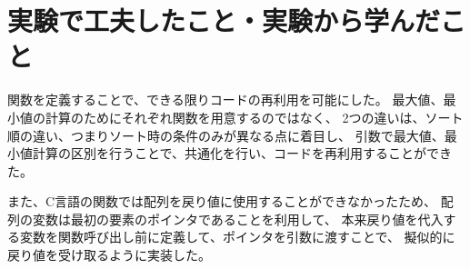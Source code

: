 

\section{実験で工夫したこと・実験から学んだこと}
関数を定義することで、できる限りコードの再利用を可能にした。
最大値、最小値の計算のためにそれぞれ関数を用意するのではなく、
2つの違いは、ソート順の違い、つまりソート時の条件のみが異なる点に着目し、
引数で最大値、最小値計算の区別を行うことで、共通化を行い、コードを再利用することができた。

また、C言語の関数では配列を戻り値に使用することができなかったため、
配列の変数は最初の要素のポインタであることを利用して、
本来戻り値を代入する変数を関数呼び出し前に定義して、ポインタを引数に渡すことで、
擬似的に戻り値を受け取るように実装した。


